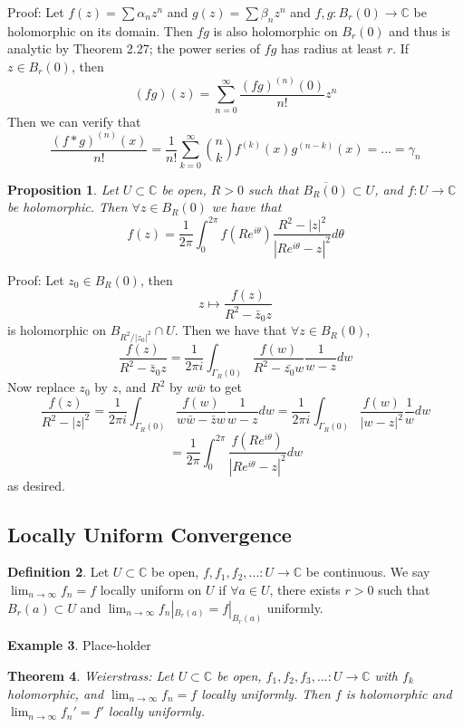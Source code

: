 \documentclass[11pt]{article}
\theoremstyle{plain}
\newtheorem{theorem}{Theorem}[section]
\newtheorem{proposition}[theorem]{Proposition}
\theoremstyle{definition}
\newtheorem{definition}[theorem]{Definition}
\newtheorem{example}[theorem]{Example}
\newcommand{\C}{\mathbb{C}}
\begin{document}
 Proof: Let $f(z) = \sum \alpha_n z^n$ and $g(z) = \sum \beta_n z^n$ and $f, g: B_r(0) \to \C$ be holomorphic on its domain. Then $f g$ is also holomorphic on $B_r(0)$ and thus is analytic by Theorem 2.27; the power series of $fg$ has radius at least $r$. If $z \in B_r(0)$, then 
 $$ (fg)(z) = \sum_{n=0}^{\infty} \frac{(fg)^{(n)}(0)}{n!} z^n $$  
 Then we can verify that 
 $$ \frac{(f*g)^{(n)}(x)}{n!} = \frac{1}{n!} \sum_{k=0}^{\infty} \binom{n}{k} f^{(k)}(x)g^{(n-k)}(x) = ... = \gamma_n $$

\begin{proposition}
Let $U \subset \C$ be open, $R >0$ such that $\overline{B_R(0)} \subset U$, and $f: U \to \C$ be holomorphic. Then $\forall z \in B_R(0)$ we have that 
$$ f(z) = \frac{1}{2\pi} \int_0^{2\pi} f(Re^{i\theta}) \frac{R^2 - |z|^2}{|Re^{i\theta} - z|^2} d\theta $$
\end{proposition}

Proof: Let $z_0 \in B_R(0)$, then 
$$ z \mapsto \frac{f(z)}{R^2 - \bar{z}_0z} $$
is holomorphic on $B_{R^2 / |z_0|^2} \cap U$. Then we have that $\forall z \in B_R(0)$, 
$$ \frac{f(z)}{R^2 - \bar{z}_0z} = \frac{1}{2\pi i} \int_{\Gamma_R(0)} \frac{f(w)}{R^2 - \bar{z_0}w} \frac{1}{w-z}dw $$
Now replace $z_0$ by $z$, and $R^2$ by $w\bar{w}$ to get 
$$ \frac{f(z)}{R^2 - |z|^2} = \frac{1}{2\pi i}\int_{\Gamma_R(0)} \frac{f(w)}{w\bar{w} - \bar{z}w} \frac{1}{w-z} dw = \frac{1}{2\pi i} \int_{\Gamma_R(0)} \frac{f(w)}{|w - z|^2} \frac{1}{w} dw $$
$$ = \frac{1}{2\pi}\int_0^{2\pi} \frac{f(Re^{i\theta})}{|Re^{i\theta} - z|^2}dw $$
as desired.

\subsection{Locally Uniform Convergence}
\begin{definition}
Let $U\subset\C$ be open, $f, f_1, f_2,... : U \to \C$ be continuous. We say $\lim_{n\to\infty} f_n = f$ locally uniform on $U$ if $\forall a \in U$, there exists $r > 0$ such that $B_r(a) \subset U$ and $\lim_{n\to\infty} f_n|_{B_r(a)} = f|_{B_r(a)}$ uniformly. 
\end{definition}

\begin{example}
Place-holder
\end{example}

\begin{theorem}
Weierstrass: Let $U\subset\C$ be open, $f_1, f_2, f_3,... :U \to \C$ with $f_k$ holomorphic, and $\lim_{n\to\infty}f_n = f$ locally uniformly. Then $f$ is holomorphic and $\lim_{n\to\infty}f_n' = f'$ locally uniformly.
\end{theorem}
\end{document}
